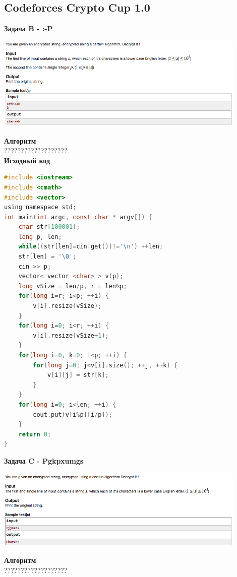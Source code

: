 \documentclass[a4paper,12pt]{article}
\begin{document}
%
%
\newpage
\subsection{Codeforces Crypto Cup 1.0}

\textbf{{\large Задача B - :-P}} \\
\begin{center}
\includegraphics[width=0.9\textwidth]{CT_Crypto/CT_Crypto_B.png}\\ [1cm]
\end{center}
\textbf{{\large Алгоритм}} \\
{\Huge ???????????????????} \\ 

\textbf{{\large Исходный код}}
\begin{lstlisting}[language=C]
#include <iostream>
#include <cmath>
#include <vector>
using namespace std;
int main(int argc, const char * argv[]) {
    char str[100001];
    long p, len;
    while((str[len]=cin.get())!='\n') ++len;
    str[len] = '\0';
    cin >> p;
    vector< vector <char> > v(p);
    long vSize = len/p, r = len%p;
    for(long i=r; i<p; ++i) {
        v[i].resize(vSize);
    }
    for(long i=0; i<r; ++i) {
        v[i].resize(vSize+1);
    }
    for(long i=0, k=0; i<p; ++i) {
        for(long j=0; j<v[i].size(); ++j, ++k) {
            v[i][j] = str[k];
        }
    }
    for(long i=0; i<len; ++i) {
        cout.put(v[i%p][i/p]);
    }
    return 0;
}
\end{lstlisting}

\newpage
\textbf{{\large Задача C - Pgkpxumgs}} \\
\begin{center}
\includegraphics[width=0.9\textwidth]{CT_Crypto/CT_Crypto_C.png}\\ [1cm]
\end{center}
\textbf{{\large Алгоритм}} \\
{\Huge ???????????????????} \\ 
\end{document}
